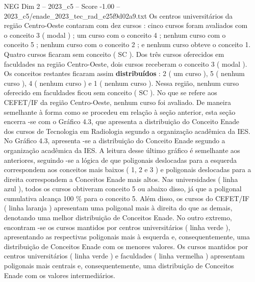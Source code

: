 \begin{textsample}{NEG Dim 2 – 2023\_c5 – Score -1.00 – 2023\_c5/enade\_2023\_tec\_rad\_e25f9d02a9.txt}
Os centros universitários da região Centro-Oeste contaram com dez cursos : cinco cursos foram avaliados com o conceito 3 ( modal ) ; um curso com o conceito 4 ; nenhum curso com o conceito 5 ; nenhum curso com o conceito 2 ; e nenhum curso obteve o conceito 1.
Quatro cursos ficaram sem conceito ( SC ).
Dos três cursos oferecidos em faculdades na região Centro-Oeste, dois cursos receberam o conceito 3 ( modal ).
Os conceitos restantes ficaram assim \textbf{distribuídos} : 2 ( um curso ), 5 ( nenhum curso ), 4 ( nenhum curso ) e 1 ( nenhum curso ).
Nessa região, nenhum curso oferecido em faculdades ficou sem conceito ( SC ).
No que se refere aos CEFET/IF da região Centro-Oeste, nenhum curso foi avaliado.
De maneira semelhante à forma como se procedeu em relação à seção anterior, esta seção encerra -se com o Gráfico 4.3, que apresenta a distribuição do Conceito Enade dos cursos de Tecnologia em Radiologia segundo a organização acadêmica da IES.
No Gráfico 4.3, apresenta -se a distribuição do Conceito Enade segundo a organização acadêmica da IES.
A leitura desse último gráfico é semelhante aos anteriores, seguindo -se a lógica de que poligonais deslocadas para a esquerda correspondem aos conceitos mais baixos ( 1, 2 e 3 ) e poligonais deslocadas para a direita correspondem a Conceitos Enade mais altos.
Nas universidades ( linha azul ), todos os cursos obtiveram conceito 5 ou abaixo disso, já que a poligonal cumulativa alcança 100 \% para o conceito 5.
Além disso, os cursos do CEFET/IF ( linha laranja ) apresentam uma poligonal mais à direita do que as demais, denotando uma melhor distribuição de Conceitos Enade.
No outro extremo, encontram -se os cursos mantidos por centros universitários ( linha verde ), apresentando as respectivas poligonais mais à esquerda e, consequentemente, uma distribuição de Conceitos Enade com os menores valores.
Os cursos mantidos por centros universitários ( linha verde ) e faculdades ( linha vermelha ) apresentam poligonais mais centrais e, consequentemente, uma distribuição de Conceitos Enade com os valores intermediários.

\end{textsample}
